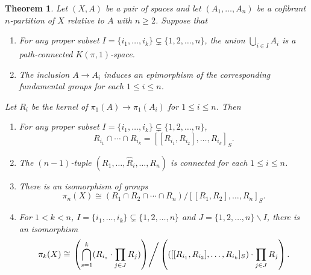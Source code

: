 \documentclass[10pt]{amsart}
\newtheorem{thm}{Theorem}[section]
\numberwithin{equation}{section}
\begin{document}
\begin{thm}
Let $(X,A)$ be a pair of spaces and let $(A_1,\ldots,A_n)$ be a cofibrant $n$-partition of $X$ relative to $A$ with $n\geq 2$. Suppose that
\begin{enumerate}
\item[i)] For any proper subset $I=\{i_1,\ldots,i_k\}\subsetneq \{1,2,\ldots,n\}$, the union
$
\bigcup_{i\in I}A_i
$
is a path-connected $K(\pi,1)$-space.
\item[ii)] The inclusion $A \to A_i$ induces an epimorphism of the corresponding fundamental groups for each $1\leq i\leq n$.
\end{enumerate}
Let $R_i$ be the kernel of $\pi_1(A)\to \pi_1(A_i)$ for $1\leq i\leq n$. Then
\begin{enumerate}
\item For any proper subset $I=\{i_1,\ldots,i_k\}\subsetneq \{1,2,\ldots,n\}$,
$$
R_{i_1}\cap\cdots\cap R_{i_k}=[[R_{i_1}, R_{i_2}],\ldots,R_{i_k}]_S.
$$
\item The $(n-1)$-tuple $(R_1,\ldots,\hat R_i,\ldots,R_n)$ is connected for each $1\leq i\leq n$.
\item There is an isomorphism of groups
$$
\pi_n(X)\cong (R_1\cap R_2\cap \cdots\cap R_n)/[[R_1,R_2],\ldots,R_n]_S.
$$
\item For $1< k< n$, $I=\{i_1,\ldots,i_k\}\subsetneq \{1,2,\ldots,n\}$ and $J= \{1,2,\ldots,n\}\smallsetminus I$, there is an isomorphism
$$
\pi_k(X)\cong \left.\left(\bigcap_{s=1}^k(R_{i_s}\cdot \prod_{j\in J}R_j)\right)\right/\left(([[R_{i_1}, R_{i_2}],\ldots,R_{i_k}]_S)\cdot \prod_{j\in J}R_j \right).
$$
\end{enumerate}
\end{thm}
\end{document}
